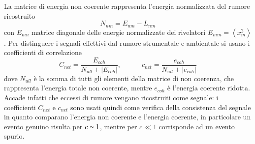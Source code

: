 La matrice di energia non coerente rappresenta l'energia normalizzata del rumore ricostruito
\begin{equation}
	N_{nm} = E_{nm}-L_{nm}
\end{equation}
con $E_{mn}$  matrice diagonale delle energie normalizzate dei rivelatori $E_{mm}  = \left<x_m^2\right>$. Per distinguere i segnali effettivi dal rumore strumentale e ambientale si usano i coefficienti di correlazione 
\begin{equation}
	C_{net} = \frac{E_{coh}}{N_{ull}+|E_{coh}|}, \quad\quad\quad c_{net} = \frac{e_{coh}}{N_{ull}+|e_{coh}|}
	\label{eqn:coefficient_energy}
\end{equation}
dove $N_{ull}$ è la somma di tutti gli elementi della matrice di non coerenza, che rappresenta l'energia totale non coerente, mentre $e_{coh}$ è l'energia coerente ridotta. Accade infatti che eccessi di rumore vengano ricostruiti come segnale: i coefficienti $C_{net}$ e $c_{net}$ sono usati quindi come verifica della consistenza del segnale in quanto comparano l'energia non coerente e l'energia coerente\cite{Klimenko_2008}, in particolare un evento genuino risulta per $c\smallsim 1$, mentre per $c \ll 1$ corrisponde ad un evento spurio\cite{Klimenko_2016}.